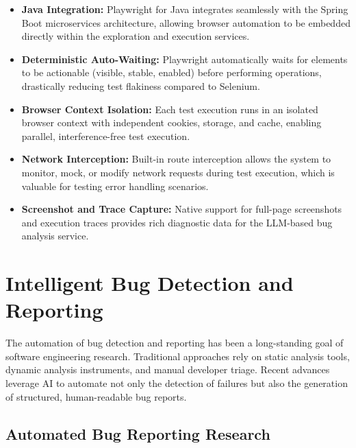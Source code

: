 \begin{itemize}[nosep]
  \item \textbf{Java Integration:} Playwright for Java integrates
        seamlessly with the Spring Boot microservices architecture,
        allowing browser automation to be embedded directly within the
        exploration and execution services.
  \item \textbf{Deterministic Auto-Waiting:} Playwright automatically
        waits for elements to be actionable (visible, stable, enabled)
        before performing operations, drastically reducing test
        flakiness compared to Selenium.
  \item \textbf{Browser Context Isolation:} Each test execution runs
        in an isolated browser context with independent cookies, storage,
        and cache, enabling parallel, interference-free test execution.
  \item \textbf{Network Interception:} Built-in route interception
        allows the system to monitor, mock, or modify network requests
        during test execution, which is valuable for testing error
        handling scenarios.
  \item \textbf{Screenshot and Trace Capture:} Native support for
        full-page screenshots and execution traces provides rich
        diagnostic data for the LLM-based bug analysis service.
\end{itemize}

\section{Intelligent Bug Detection and Reporting}
\label{sec:intelligent_bug_detection}

The automation of bug detection and reporting has been a long-standing
goal of software engineering research. Traditional approaches rely on
static analysis tools, dynamic analysis instruments, and manual
developer triage. Recent advances leverage AI to automate not only the
detection of failures but also the generation of structured,
human-readable bug reports.

\subsection{Automated Bug Reporting Research}
\label{subsec:automated_bug_reports}

